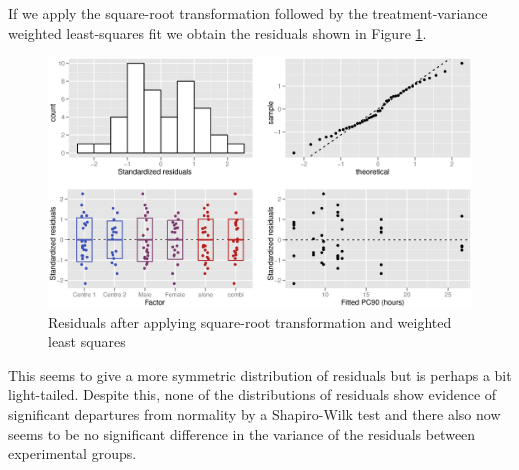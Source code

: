 If we apply the square-root transformation followed by the treatment-variance weighted least-squares fit we obtain the residuals shown in Figure \ref{aovsqrtresw}.
\begin{figure}[h]
\includegraphics[width=150mm]{aovsqrtresw.eps} 
\caption{Residuals after applying square-root transformation and weighted least squares}
\label{aovsqrtresw}
\end{figure}

This seems to give a more symmetric distribution of residuals but is perhaps a bit light-tailed.
Despite this, none of the distributions of residuals show evidence of significant departures from normality by a Shapiro-Wilk test and there also now seems to be no significant difference in the variance of the residuals between experimental groups.

